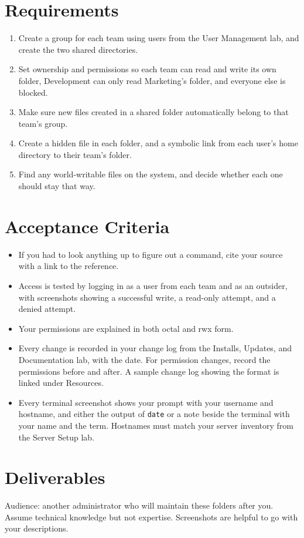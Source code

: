 \documentclass[12pt]{article}
\begin{document}
\section*{Requirements}
\begin{enumerate}
    \item Create a group for each team using users from the User Management lab, and create the two shared directories.
    \item Set ownership and permissions so each team can read and write its own folder, Development can only read Marketing's folder, and everyone else is blocked.
    \item Make sure new files created in a shared folder automatically belong to that team's group.
    \item Create a hidden file in each folder, and a symbolic link from each user's home directory to their team's folder.
    \item Find any world-writable files on the system, and decide whether each one should stay that way.
\end{enumerate}

\section*{Acceptance Criteria}
\begin{itemize}
    \item If you had to look anything up to figure out a command, cite your source with a link to the reference.
    \item Access is tested by logging in as a user from each team and as an outsider, with screenshots showing a successful write, a read-only attempt, and a denied attempt.
    \item Your permissions are explained in both octal and rwx form.
    \item Every change is recorded in your change log from the Installs, Updates, and Documentation lab, with the date. For permission changes, record the permissions before and after. A sample change log showing the format is linked under Resources.
    \item Every terminal screenshot shows your prompt with your username and hostname, and either the output of \texttt{date} or a note beside the terminal with your name and the term. Hostnames must match your server inventory from the Server Setup lab.
\end{itemize}

\section*{Deliverables}
Audience: another administrator who will maintain these folders after you. Assume technical knowledge but not expertise.  Screenshots are helpful to go with your descriptions.
\end{document}
